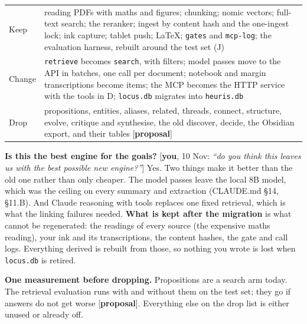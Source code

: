 \documentclass[10pt]{extarticle}
\newcommand{\you}[2]{{\small[\textbf{you}, #1: \textit{``#2''}]}}
\newcommand{\prop}{{\small[\textbf{proposal}]}}
\begin{document}
\begin{tabularx}{\linewidth}{@{}l Y@{}}
\toprule
Keep & reading PDFs with maths and figures; chunking; nomic vectors; full-text search; the reranker; ingest by content hash and the one-ingest lock; ink capture; tablet push; LaTeX; \texttt{gates} and \texttt{mcp-log}; the evaluation harness, rebuilt around the test set (J) \\
Change & \texttt{retrieve} becomes \texttt{search}, with filters; model passes move to the API in batches, one call per document; notebook and margin transcriptions become items; the MCP becomes the HTTP service with the tools in D; \texttt{locus.db} migrates into \texttt{heuris.db} \\
Drop & propositions, entities, aliases, related, threads, connect, structure, evolve, critique and synthesise, the old discover, decide, the Obsidian export, and their tables \prop \\
\bottomrule
\end{tabularx}

\medskip
\textbf{Is this the best engine for the goals?} \you{10 Nov}{do you think this leaves us with the best possible new engine?} Yes. Two things make it better than the old one rather than only cheaper. The model passes leave the local 8B model, which was the ceiling on every summary and extraction (CLAUDE.md \S14, \S11.B). And Claude reasoning with tools replaces one fixed retrieval, which is what the linking failures needed. \textbf{What is kept after the migration} is what cannot be regenerated: the readings of every source (the expensive maths reading), your ink and its transcriptions, the content hashes, the gate and call logs. Everything derived is rebuilt from those, so nothing you wrote is lost when \texttt{locus.db} is retired.

\textbf{One measurement before dropping.} Propositions are a search arm today. The retrieval evaluation runs with and without them on the test set; they go if answers do not get worse \prop. Everything else on the drop list is either unused or already off.
\end{document}
